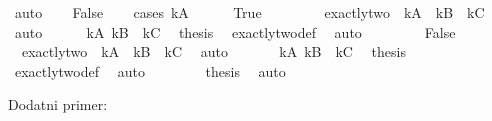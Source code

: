 \begin{isabellebody}
\begin{exercise}[subtitle=Logčki lavirinti.]
\ auto\isanewline
\ \ \isamarkupfalse%
\ False\isanewline
\ \ \isamarkupfalse%
\ {\isacharparenleft}{\kern0pt}cases\ kA{\isacharparenright}{\kern0pt}\isanewline
\ \ \ \ \isamarkupfalse%
\ True\isanewline
\ \ \ \ \isamarkupfalse%
\ {\isacharasterisk}{\kern0pt}\ \isamarkupfalse%
\ {\isachardoublequoteopen}exactly{\isacharunderscore}{\kern0pt}two\ {\isacharparenleft}{\kern0pt}{\isasymnot}\ kA{\isacharparenright}{\kern0pt}\ {\isacharparenleft}{\kern0pt}{\isasymnot}\ kB{\isacharparenright}{\kern0pt}\ {\isacharparenleft}{\kern0pt}{\isasymnot}\ kC{\isacharparenright}{\kern0pt}{\isachardoublequoteclose}\ \isamarkupfalse%
\ auto\isanewline
\ \ \ \ \isamarkupfalse%
\ {\isacartoucheopen}kA{\isacartoucheclose}\ {\isacartoucheopen}kB{\isacartoucheclose}\ {\isacartoucheopen}{\isasymnot}\ kC{\isacartoucheclose}\ \isamarkupfalse%
\ {\isacharquery}{\kern0pt}thesis\ \isamarkupfalse%
\ exactly{\isacharunderscore}{\kern0pt}two{\isacharunderscore}{\kern0pt}def\ \isamarkupfalse%
\ auto\isanewline
\ \ \isamarkupfalse%
\isanewline
\ \ \ \ \isamarkupfalse%
\ False\isanewline
\ \ \ \ \isamarkupfalse%
\ {\isacharasterisk}{\kern0pt}\ \isamarkupfalse%
\ {\isachardoublequoteopen}{\isasymnot}\ exactly{\isacharunderscore}{\kern0pt}two\ {\isacharparenleft}{\kern0pt}{\isasymnot}\ kA{\isacharparenright}{\kern0pt}\ {\isacharparenleft}{\kern0pt}{\isasymnot}\ kB{\isacharparenright}{\kern0pt}\ {\isacharparenleft}{\kern0pt}{\isasymnot}\ kC{\isacharparenright}{\kern0pt}{\isachardoublequoteclose}\ \isamarkupfalse%
\ auto\isanewline
\ \ \ \ \isamarkupfalse%
\ {\isacartoucheopen}{\isasymnot}\ kA{\isacartoucheclose}\ {\isacartoucheopen}kB{\isacartoucheclose}\ {\isacartoucheopen}{\isasymnot}\ kC{\isacartoucheclose}\ \isamarkupfalse%
\ {\isacharquery}{\kern0pt}thesis\ \isamarkupfalse%
\ exactly{\isacharunderscore}{\kern0pt}two{\isacharunderscore}{\kern0pt}def\ \isamarkupfalse%
\ auto\isanewline
\ \ \isamarkupfalse%
\isanewline
\ \ \isamarkupfalse%
\ \isamarkupfalse%
\ {\isacharquery}{\kern0pt}thesis\ \isamarkupfalse%
\ auto\isanewline
{}\isamarkupfalse%
%
\endisatagproof
{\isafoldproof}%
%
\isadelimproof
%
\endisadelimproof
%
\begin{isamarkuptext}%
Dodatni primer:%
\end{isamarkuptext}\isamarkuptrue%

\end{exercise}
\end{isabellebody}
